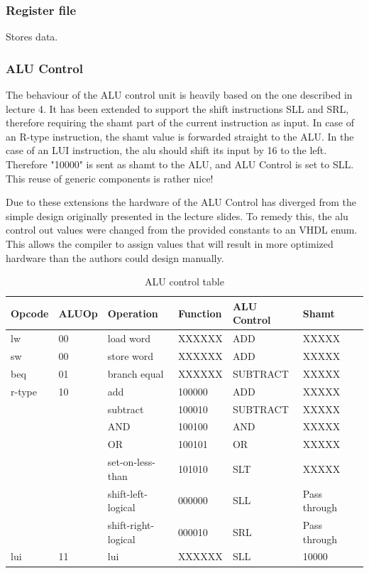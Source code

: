 \subsubsection{Register file}

Stores data.

\subsubsection{ALU Control}

The behaviour of the ALU control unit is heavily based on the one described in lecture 4\cite{lecture-4}.
It has been extended to support the shift instructions SLL and SRL, therefore requiring the shamt part of the current instruction as input.
In case of an R-type instruction, the shamt value is forwarded straight to the ALU.
In the case of an LUI instruction, the alu should shift its input by 16 to the left.
Therefore "10000" is sent as shamt to the ALU, and ALU Control is set to SLL.
This reuse of generic components is rather nice!

Due to these extensions the hardware of the ALU Control has diverged from the simple design originally presented in the lecture slides.
To remedy this, the alu control out values were changed from the provided constants to an VHDL enum.
This allows the compiler to assign values that will result in more optimized hardware than the authors could design manually.

\begin{table}[ht!]
    \begin{tabular}{|l|l|l|l|l|l|l|}
    \hline
    Opcode & ALUOp & Operation           & Function & ALU Control & Shamt   \\ \hline
    lw     & 00    & load word           & XXXXXX   & ADD         & XXXXX \\ \hline
    sw     & 00    & store word          & XXXXXX   & ADD         & XXXXX \\ \hline
    beq    & 01    & branch equal        & XXXXXX   & SUBTRACT    & XXXXX \\ \hline
    r-type & 10    & add                 & 100000   & ADD         & XXXXX \\ \cline{3-6}
           &       & subtract            & 100010   & SUBTRACT    & XXXXX \\ \cline{3-6}
           &       & AND                 & 100100   & AND         & XXXXX \\ \cline{3-6}
           &       & OR                  & 100101   & OR          & XXXXX \\ \cline{3-6}
           &       & set-on-less-than    & 101010   & SLT         & XXXXX \\ \cline{3-6}
           &       & shift-left-logical  & 000000   & SLL         & Pass through \\ \cline{3-6}
           &       & shift-right-logical & 000010   & SRL         & Pass through \\ \hline
    lui    & 11    & lui                 & XXXXXX   & SLL         & 10000 \\ \hline
    \end{tabular}
    \caption{ALU control table}
    \label{tab:alu-control}
\end{table}

